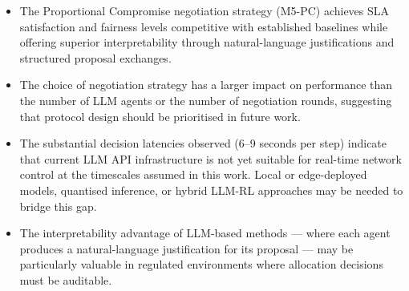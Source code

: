 \begin{itemize}
    \item The Proportional Compromise negotiation strategy (M5-PC) achieves SLA satisfaction and fairness levels competitive with established baselines while offering superior interpretability through natural-language justifications and structured proposal exchanges.

    \item The choice of negotiation strategy has a larger impact on performance than the number of LLM agents or the number of negotiation rounds, suggesting that protocol design should be prioritised in future work.

    \item The substantial decision latencies observed (6--9 seconds per step) indicate that current LLM API infrastructure is not yet suitable for real-time network control at the timescales assumed in this work. Local or edge-deployed models, quantised inference, or hybrid LLM-RL approaches may be needed to bridge this gap.

    \item The interpretability advantage of LLM-based methods --- where each agent produces a natural-language justification for its proposal --- may be particularly valuable in regulated environments where allocation decisions must be auditable.
\end{itemize}

